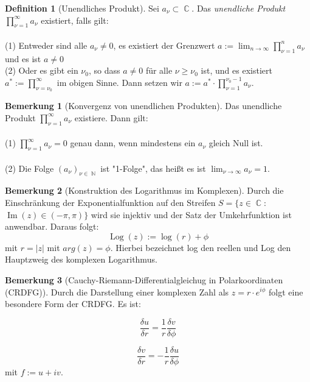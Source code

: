 \documentclass[10pt,a4paper]{article}
\theoremstyle{plain}
\theoremstyle{definition}
\newtheorem{defn}{Definition}[section]
\newtheorem*{note}{Bemerkung}
\theoremstyle{remark}
\DeclareMathOperator{\C}{\mathbb{C}}
\DeclareMathOperator{\N}{\mathbb{N}}
\DeclareMathOperator{\im}{Im}
\DeclareMathOperator{\Log}{Log}
\begin{document}
\begin{defn}[Unendliches Produkt]
Sei $a_{\nu}\subset \C$. Das \textit{unendliche Produkt} $\prod_{\nu = 1 }^{\infty}a_{\nu}$ existiert, falls gilt:
\\
\\
(1) Entweder sind alle $a_{\nu}\neq 0$, es existiert der Grenzwert $ a := \lim_{n \to \infty} \prod_{\nu = 1}^{n} a_{\nu}$ und es ist $a \neq 0$
\\
(2) Oder es gibt ein $\nu_{0}$, so dass $a \neq 0$ für alle $\nu \geq \nu_{0}$ ist, und es existiert $a^{*} := \prod_{\nu = \nu_{0}}^{\infty}$ im obigen Sinne. Dann setzen wir $a := a^{*} 
\cdot \prod_{\nu = 1}^{\nu_{0} - 1}a_{\nu}$.

\end{defn}

\begin{note}[Konvergenz von unendlichen Produkten]

Das unendliche Produkt $\prod_{\nu = 1 }^{\infty}a_{\nu}$ existiere. Dann gilt:
\\
\\
(1) $\prod_{\nu = 1}^{\infty}a_{\nu} = 0$ genau dann, wenn mindestens ein $a_{\nu}$ gleich Null ist.
\\
\\
(2) Die Folge $(a_\nu)_{\nu \in \N}$ ist "1-Folge", das heißt es ist $\lim_{\nu \rightarrow\infty}a_{\nu} = 1$.

\end{note}

\begin{note}[Konstruktion des Logarithmus im Komplexen]

Durch die \\Einschränkung der Exponentialfunktion auf den Streifen $S = \{ z \in \C : $\\$\im(z) \in (-\pi, \pi)\}$ wird sie injektiv und der Satz der Umkehrfunktion ist anwendbar. Daraus folgt:$$\Log(z) := \log(r) + \phi$$ mit $r=|z|$ mit $arg(z)= \phi$. Hierbei bezeichnet log den reellen und Log den Hauptzweig des komplexen Logarithmus.

\end{note}

\begin{note}[Cauchy-Riemann-Differentialgleichug in Polarkoordinaten (CRDFG)]

Durch die Darstellung einer komplexen Zahl als $z = r\cdot e^{i\phi}$ folgt eine besondere Form der CRDFG. Es ist: 

\begin{equation} \label{eq:crdfg1}
\frac{\delta u}{\delta r} = \frac{1}{r} \frac{\delta v}{\delta \phi}
\end{equation}

\begin{equation} \label{eq:crdfg2}
\frac{\delta v}{\delta r} = -\frac{1}{r} \frac{\delta u}{\delta \phi}
\end{equation}
mit $f := u + iv$.

\end{note}
\end{document}
